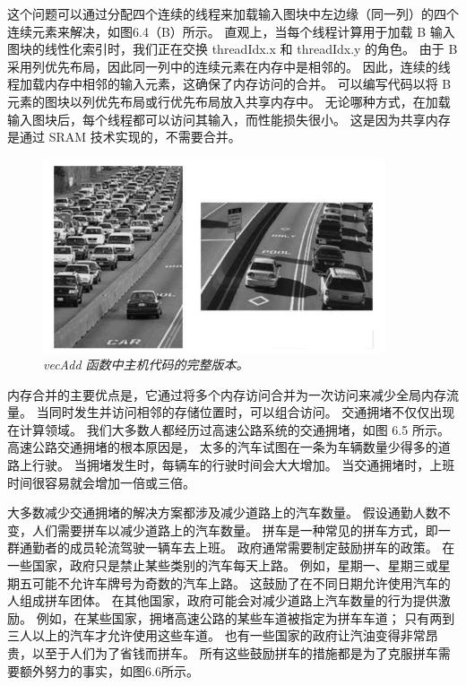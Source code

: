 这个问题可以通过分配四个连续的线程来加载输入图块中左边缘（同一列）的四个连续元素来解决，如图6.4（B）所示。 
直观上，当每个线程计算用于加载 B 输入图块的线性化索引时，我们正在交换 threadIdx.x 和 threadIdx.y 的角色。 
由于 B 采用列优先布局，因此同一列中的连续元素在内存中是相邻的。 
因此，连续的线程加载内存中相邻的输入元素，这确保了内存访问的合并。 
可以编写代码以将 B 元素的图块以列优先布局或行优先布局放入共享内存中。 
无论哪种方式，在加载输入图块后，每个线程都可以访问其输入，而性能损失很小。 
这是因为共享内存是通过 SRAM 技术实现的，不需要合并。

\begin{figure}[H]
	\centering
	\includegraphics[width=0.9\textwidth]{figs/F6.5.png}
	\caption{\textit{\color{red} vecAdd 函数中主机代码的完整版本。}}
\end{figure}

内存合并的主要优点是，它通过将多个内存访问合并为一次访问来减少全局内存流量。 
当同时发生并访问相邻的存储位置时，可以组合访问。 交通拥堵不仅仅出现在计算领域。 
我们大多数人都经历过高速公路系统的交通拥堵，如图 6.5 所示。 高速公路交通拥堵的根本原因是，
太多的汽车试图在一条为车辆数量少得多的道路上行驶。 当拥堵发生时，每辆车的行驶时间会大大增加。 
当交通拥堵时，上班时间很容易就会增加一倍或三倍。

大多数减少交通拥堵的解决方案都涉及减少道路上的汽车数量。 假设通勤人数不变，人们需要拼车以减少道路上的汽车数量。 
拼车是一种常见的拼车方式，即一群通勤者的成员轮流驾驶一辆车去上班。 政府通常需要制定鼓励拼车的政策。 
在一些国家，政府只是禁止某些类别的汽车每天上路。 例如，星期一、星期三或星期五可能不允许车牌号为奇数的汽车上路。 
这鼓励了在不同日期允许使用汽车的人组成拼车团体。 在其他国家，政府可能会对减少道路上汽车数量的行为提供激励。 
例如，在某些国家，拥堵高速公路的某些车道被指定为拼车车道； 只有两到三人以上的汽车才允许使用这些车道。 
也有一些国家的政府让汽油变得非常昂贵，以至于人们为了省钱而拼车。 
所有这些鼓励拼车的措施都是为了克服拼车需要额外努力的事实，如图6.6所示。

